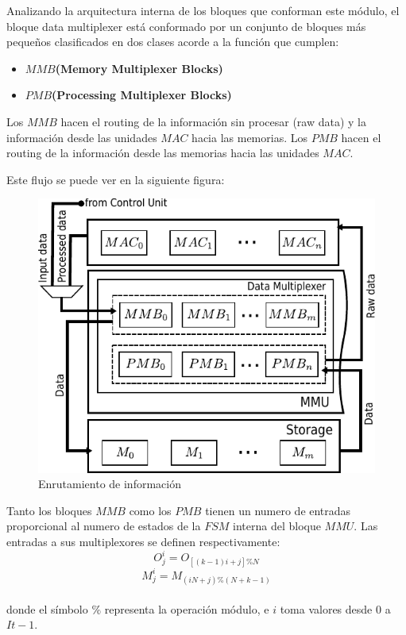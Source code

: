 \documentclass[]{IEEEphot}
\begin{document}
\bigskip
Analizando la arquitectura interna de los bloques que conforman este módulo, el bloque data multiplexer está conformado por un conjunto de bloques más pequeños clasificados en dos clases acorde a la función que cumplen:
\begin{frame}{}
\begin{itemize}

 \item \textbf{$MMB$(Memory Multiplexer Blocks)}
  \item \textbf{$PMB$(Processing Multiplexer Blocks)}

\end{itemize}
\end{frame}


Los $MMB$ hacen el routing de la información sin procesar (raw data) y la información desde las unidades $MAC$ hacia las memorias.
Los $PMB$ hacen el routing de la información desde las memorias hacia las unidades $MAC$.\\
\bigskip

Este flujo se puede ver en la siguiente figura:
\begin{figure}[H]
\centering
\includegraphics[scale=0.9]{muxes}
\caption{ Enrutamiento de información}
\label{mmu_routing}
\end{figure}
Tanto los bloques $MMB$ como los $PMB$ tienen un numero de entradas proporcional al numero de estados de la $FSM$ interna del bloque $MMU$. 
Las entradas a sus multiplexores se definen respectivamente:
\begin{equation}%
  O_j^i = O_{[(k-1)i+j]\%N}
\end{equation}
\begin{equation}%
  M_j^i = M_{(iN+j)\%(N+k-1)}
\end{equation}
\\
donde el símbolo $ \% $ representa la operación módulo, e $i$ toma valores desde $0$ a $It-1$.
\end{document}
